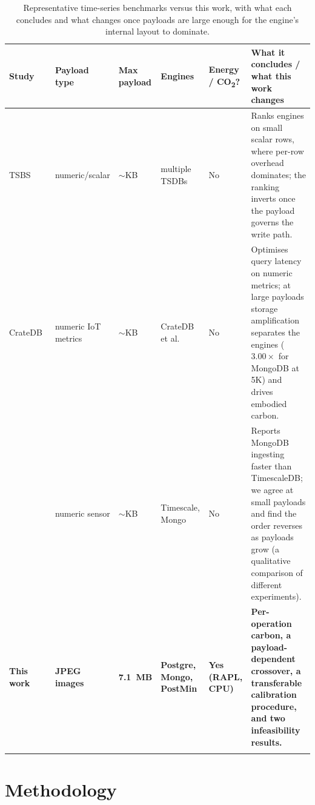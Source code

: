 \documentclass[pdflatex,sn-basic]{sn-jnl}%
\begin{document}
\begin{table}[htbp]
\color{markup}
\caption{Representative time-series benchmarks versus this work, with what each concludes and what changes once payloads are large enough for the engine's internal layout to dominate.}\label{tab:relwork}
\footnotesize
\setlength{\tabcolsep}{3pt}
\begin{tabular}{@{}L{0.155\textwidth}L{0.115\textwidth}L{0.065\textwidth}L{0.115\textwidth}L{0.075\textwidth}L{0.315\textwidth}@{}}
\toprule
Study & Payload type & Max payload & Engines & Energy / CO\textsubscript{2}? & What it concludes / what this work changes \\
\midrule
TSBS~\citep{tsbs} & numeric/scalar & $\sim$KB & multiple TSDBs & No & Ranks engines on small scalar rows, where per-row overhead dominates; the ranking inverts once the payload governs the write path. \\
CrateDB~\citep{cratedb_ts_benchmark} & numeric IoT metrics & $\sim$KB & CrateDB et al. & No & Optimises query latency on numeric metrics; at large payloads storage amplification separates the engines ($3.00\times$ for MongoDB at 5K) and drives embodied carbon. \\
\citet{diva_timescaledb_mongodb_eval} & numeric sensor & $\sim$KB & Timescale, Mongo & No & Reports MongoDB ingesting faster than TimescaleDB; we agree at small payloads and find the order reverses as payloads grow (a qualitative comparison of different experiments). \\
\textbf{This work} & \textbf{JPEG images} & \textbf{7.1~MB} & \textbf{Postgre, Mongo, PostMin} & \textbf{Yes (RAPL, CPU)} & \textbf{Per-operation carbon, a payload-dependent crossover, a transferable calibration procedure, and two infeasibility results.} \\
\botrule
\end{tabular}
\end{table}

\section{Methodology}\label{sec:methodology}
\end{document}
